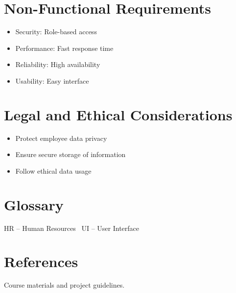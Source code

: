 \documentclass[12pt]{article}
\begin{document}
\section{Non-Functional Requirements}
\begin{itemize}
\item Security: Role-based access
\item Performance: Fast response time
\item Reliability: High availability
\item Usability: Easy interface
\end{itemize}

\section{Legal and Ethical Considerations}
\begin{itemize}
\item Protect employee data privacy
\item Ensure secure storage of information
\item Follow ethical data usage
\end{itemize}

\section*{Glossary}

HR -- Human Resources \
UI -- User Interface

\section*{References}

Course materials and project guidelines.
\end{document}
